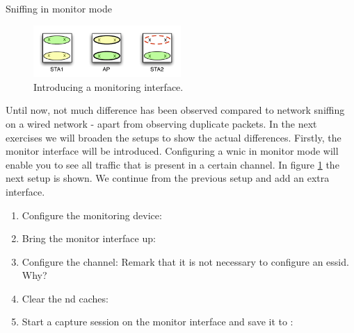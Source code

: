 \begin{exercise}{Sniffing in monitor mode}

\begin{figure}[h]
	\begin{center}
		\includegraphics[width=0.5\textwidth]{images/snif4.pdf} 
		\caption{Introducing a monitoring interface.}
		\label{fig:snif4} 
	\end{center}
\end{figure}

Until now, not much difference has been observed compared to network sniffing on a wired network - apart from observing duplicate packets. In the next exercises we will broaden the setups to show the actual differences. Firstly, the monitor interface will be introduced. Configuring a \acl{wnic} in monitor mode will enable you to see all traffic that is present in a certain channel. In figure \ref{fig:snif4} the next setup is shown. We continue from the previous setup and add an extra interface.
\begin{enumerate}
	\item Configure the monitoring device:\newline
	\item Bring the monitor interface up: \newline
	\item Configure the channel: \newline
	\remark Remark that it is not necessary to configure an \ac{essid}. Why?\newline
	\begin{esolution}
	\end{esolution}
	\item Clear the \ac{nd} caches:\newline
	\item Start a capture session on the monitor interface and save it to :\newline

\end{enumerate}
\end{exercise}
